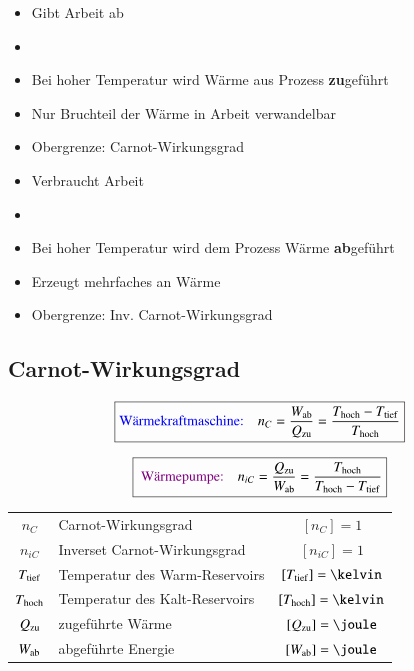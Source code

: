 \begin{minipage}[t]{0.48\columnwidth}

	\smallskip

	\begin{itemize}
		\item Gibt Arbeit ab
		\item {}
		\item Bei hoher Temperatur wird Wärme aus Prozess \textbf{zu}geführt
		\item Nur Bruchteil der Wärme in Arbeit verwandelbar
		\item Obergrenze: Carnot-Wirkungsgrad
	\end{itemize}
\end{minipage}
\hfill
\begin{minipage}[t]{0.48\columnwidth}

	\smallskip

	\begin{itemize}
		\item Verbraucht Arbeit
		\item {}
		\item Bei hoher Temperatur wird dem Prozess Wärme \textbf{ab}geführt
		\item Erzeugt mehrfaches an Wärme
		\item Obergrenze: Inv. Carnot-Wirkungsgrad
	\end{itemize}
\end{minipage}





\subsection{Carnot-Wirkungsgrad}

\vspace{-0.2cm}

$$ \boxed{\text{{\color{blue}Wärmekraftmaschine:}}  \quad n_C = \frac{W_{\rm ab}}{Q_{\rm zu}} = \frac{T_{\rm hoch} - T_{\rm tief}}{T_{\rm hoch}} } $$

$$ \boxed{\text{ {\color{violet}Wärmepumpe:}} \quad  n_{iC} = \frac{Q_{\rm zu}}{W_{\rm ab}} = \frac{T_{\rm hoch}}{T_{\rm hoch} - T_{\rm tief}} } $$


\begin{tabular}{c l c}
	$n_C$ 			& Carnot-Wirkungsgrad 				& $[n_C] = 1$ 					\\
	$n_{iC}$ 		& Inverset Carnot-Wirkungsgrad 		& $[n_{iC}] = 1$ 				\\
	$T_{\rm tief}$ 	& Temperatur des Warm-Reservoirs 	& $[T_{\rm tief}] = \kelvin$	\\
	$T_{\rm hoch}$ 	& Temperatur des Kalt-Reservoirs 	& $[T_{\rm hoch}] = \kelvin$ 	\\
	$Q_{\rm zu}$ 	& zugeführte Wärme 					& $[Q_{\rm zu}] = \joule$ 		\\ 
	$W_{\rm ab}$ 	& abgeführte Energie 				& $[W_{\rm ab}] = \joule$
\end{tabular}


